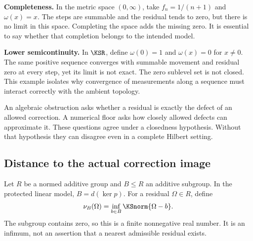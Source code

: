 \textbf{Completeness.} In the metric space \((0,\infty)\), take \(f_n=1/(n+1)\) and \(\omega(x)=x\). The steps are summable and the residual tends to zero, but there is no limit in this space. Completing the space adds the missing zero. It is essential to say whether that completion belongs to the intended model.

\textbf{Lower semicontinuity.} In \(\KSR\), define \(\omega(0)=1\) and \(\omega(x)=0\) for \(x\ne0\). The same positive sequence converges with summable movement and residual zero at every step, yet its limit is not exact. The zero sublevel set is not closed. This example isolates why convergence of measurements along a sequence must interact correctly with the ambient topology.




\label{KS:sec:floor}
An algebraic obstruction asks whether a residual is exactly the defect of an allowed correction. A numerical floor asks how closely allowed defects can approximate it. These questions agree under a closedness hypothesis. Without that hypothesis they can disagree even in a complete Hilbert setting.

\subsection{Distance to the actual correction image}
Let \(R\) be a normed additive group and \(B\le R\) an additive subgroup. In the protected linear model, \(B=d(\ker p)\). For a residual \(\Omega\in R\), define
\[
 \nu_B(\Omega)=\inf_{b\in B}\KSnorm{\Omega-b}.
\]
The subgroup contains zero, so this is a finite nonnegative real number. It is an infimum, not an assertion that a nearest admissible residual exists.

